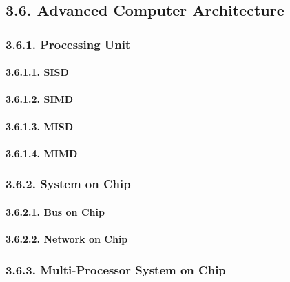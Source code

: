 \documentclass[
]{article}
\begin{document}
\hypertarget{advanced-computer-architecture-1}{%
\subsection{3.6. Advanced Computer
Architecture}\label{advanced-computer-architecture-1}}

\hypertarget{processing-unit-1}{%
\subsubsection{3.6.1. Processing Unit}\label{processing-unit-1}}

\hypertarget{sisd-1}{%
\paragraph{3.6.1.1. SISD}\label{sisd-1}}

\hypertarget{simd-1}{%
\paragraph{3.6.1.2. SIMD}\label{simd-1}}

\hypertarget{misd-1}{%
\paragraph{3.6.1.3. MISD}\label{misd-1}}

\hypertarget{mimd-1}{%
\paragraph{3.6.1.4. MIMD}\label{mimd-1}}

\hypertarget{system-on-chip-1}{%
\subsubsection{3.6.2. System on Chip}\label{system-on-chip-1}}

\hypertarget{bus-on-chip-1}{%
\paragraph{3.6.2.1. Bus on Chip}\label{bus-on-chip-1}}

\hypertarget{network-on-chip-1}{%
\paragraph{3.6.2.2. Network on Chip}\label{network-on-chip-1}}

\hypertarget{multi-processor-system-on-chip-1}{%
\subsubsection{3.6.3. Multi-Processor System on
Chip}\label{multi-processor-system-on-chip-1}}
\end{document}
